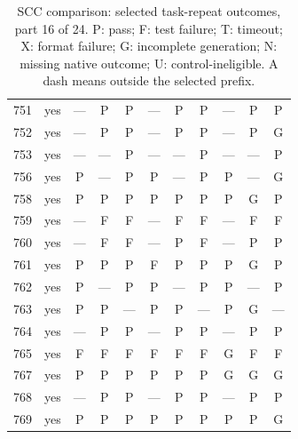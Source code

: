 \begin{table}[p]
\begin{tabular*}{\textwidth}{@{\extracolsep{\fill}}rc*{9}{c}@{}}
751 & yes & — & P & P & — & P & P & — & P & P\\
752 & yes & — & P & P & — & P & P & — & P & G\\
753 & yes & — & — & P & — & — & P & — & — & P\\
756 & yes & P & — & P & P & — & P & P & — & G\\
758 & yes & P & P & P & P & P & P & P & G & P\\
759 & yes & — & F & F & — & F & F & — & F & F\\
760 & yes & — & F & F & — & P & F & — & P & P\\
761 & yes & P & P & P & F & P & P & P & G & P\\
762 & yes & P & — & P & P & — & P & P & — & P\\
763 & yes & P & P & — & P & P & — & P & G & —\\
764 & yes & — & P & P & — & P & P & — & P & P\\
765 & yes & F & F & F & F & F & F & G & F & F\\
767 & yes & P & P & P & P & P & P & G & G & G\\
768 & yes & — & P & P & — & P & P & — & P & P\\
769 & yes & P & P & P & P & P & P & P & P & G\\
\bottomrule\end{tabular*}
\caption{SCC comparison: selected task-repeat outcomes, part 16 of 24. P: pass; F: test failure; T: timeout; X: format failure; G: incomplete generation; N: missing native outcome; U: control-ineligible. A dash means outside the selected prefix.}
\end{table}
\clearpage

